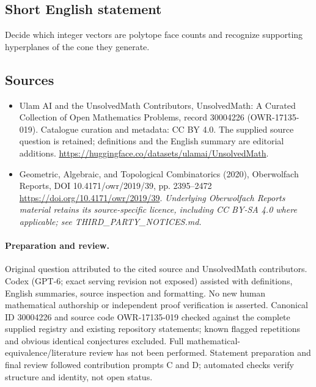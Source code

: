 \documentclass[11pt]{article}
\begin{document}
\subsection{Short English statement}
Decide which integer vectors are polytope face counts and recognize supporting hyperplanes of the cone they generate.
\subsection{Sources}
\begin{itemize}
\item[\hypertarget{source:30004226:1}{S1}] Ulam AI and the UnsolvedMath Contributors, UnsolvedMath: A Curated Collection of Open Mathematics Problems, record 30004226 (OWR-17135-019). Catalogue curation and metadata: CC BY 4.0. The supplied source question is retained; definitions and the English summary are editorial additions.
\url{https://huggingface.co/datasets/ulamai/UnsolvedMath}.
\item[\hypertarget{source:30004226:2}{S2}] Geometric, Algebraic, and Topological Combinatorics (2020), Oberwolfach Reports, DOI 10.4171/owr/2019/39, pp. 2395--2472
\url{https://doi.org/10.4171/owr/2019/39}.
\textit{Underlying Oberwolfach Reports material retains its source-specific licence, including CC BY-SA 4.0 where applicable; see THIRD\_PARTY\_NOTICES.md.}
\end{itemize}
\paragraph{Preparation and review.}
Original question attributed to the cited source and UnsolvedMath contributors. Codex (GPT-6; exact serving revision not exposed) assisted with definitions, English summaries, source inspection and formatting. No new human mathematical authorship or independent proof verification is asserted. Canonical ID 30004226 and source code OWR-17135-019 checked against the complete supplied registry and existing repository statements; known flagged repetitions and obvious identical conjectures excluded. Full mathematical-equivalence/literature review has not been performed. Statement preparation and final review followed contribution prompts C and D; automated checks verify structure and identity, not open status.
\label{end:30004226}
\end{document}

